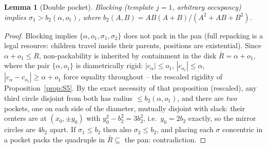 \documentclass[11pt]{article}
\newtheorem{lemma}[theorem]{Lemma}
\theoremstyle{definition}
\begin{document}
\begin{lemma}[Double pocket]\label{lem:DG}
Blocking (template $j=1$, arbitrary occupancy) implies
$\sigma_1>b_2(\alpha,o_1)$, where
$b_2(A,B)=AB(A+B)/(A^2+AB+B^2)$.
\end{lemma}
\begin{proof}
Blocking implies $\{\alpha,o_1,\sigma_1,\sigma_2\}$ does not pack in the
pan (full repacking is a legal resource: children travel inside their
parents, positions are existential). Since $\alpha+o_1\le R$,
non-packability is inherited by containment in the disk
$\bar R=\alpha+o_1$, where the pair $\{\alpha,o_1\}$ is diametrically
rigid: $|c_\alpha|\le o_1$, $|c_{o_1}|\le\alpha$,
$|c_\alpha-c_{o_1}|\ge\alpha+o_1$ force equality throughout -- the
rescaled rigidity of Proposition~\ref{prop:S5}. By the exact necessity of
that proposition (rescaled), any third circle disjoint from both has
radius $\le b_2(\alpha,o_1)$, and there are \emph{two} pockets, one on
each side of the diameter, mutually disjoint with slack: their centers are
at $(x_0,\pm y_0)$ with $y_0^2-b_2^2=3b_2^2$, i.e.\ $y_0=2b_2$ exactly, so
the mirror circles are $4b_2$ apart. If $\sigma_1\le b_2$ then also
$\sigma_2\le b_2$, and placing each $\sigma$ concentric in a pocket packs
the quadruple in $\bar R\subseteq$ the pan: contradiction.
\end{proof}
\end{document}
